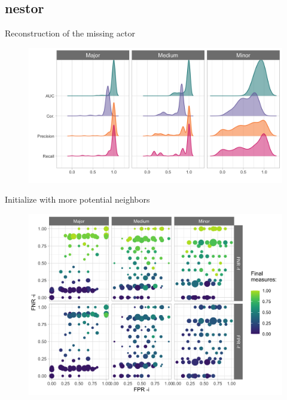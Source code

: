\documentclass[11pt]{beamer}
\begin{document}
 \subsection{nestor}
 \begin{frame}{Reconstruction of the missing actor}
  \begin{figure}
 \includegraphics[width=0.9\linewidth]{images/simu_densities.png}
 \end{figure}
 \end{frame}
  \begin{frame}{Initialize with more potential neighbors}
  \begin{figure}
 \includegraphics[width=0.8\linewidth]{images/quali_init_spca.png}
 \end{figure}
 \end{frame}
 
  
\end{document}
